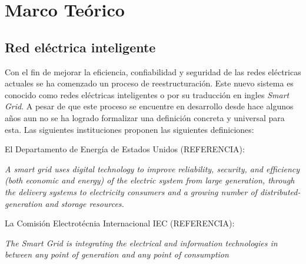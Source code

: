 \chapter{Marco Teórico}\label{sec:Marco_Teorico}
\thispagestyle{empty}
\newcommand{\subsubsubsection}[1]{\paragraph{#1}\mbox{}\\}
\setcounter{secnumdepth}{4}
\setcounter{tocdepth}{4}

\newcommand{\subsubsubsubsection}[1]{\paragraph{#1}\mbox{}\\}
\setcounter{secnumdepth}{5}
\setcounter{tocdepth}{5}

\begingroup
{}
\small

\endgroup

\section{Red eléctrica inteligente}
  \par Con el fin de mejorar la eficiencia, confiabilidad y seguridad de las redes eléctricas actuales se ha comenzado un proceso de reestructuración. Este nuevo sistema es conocido como redes eléctricas inteligentes o por su traducción en ingles \textit{Smart Grid}. A pesar de que este proceso se encuentre en desarrollo desde hace algunos años aun no se ha logrado formalizar una definición concreta y universal para esta. Las siguientes instituciones proponen las siguientes definiciones:

  \par El Departamento de Energía de Estados Unidos (REFERENCIA):
  \par \textit{A smart grid uses digital technology to improve reliability, security, and efficiency (both economic and energy) of the electric system from large generation, through the delivery systems to electricity consumers and a growing number of distributed-generation and storage resources.}

  \par La Comisión Electrotécnia Internacional IEC (REFERENCIA):
  \par \textit{The Smart Grid is integrating the electrical and information technologies in between any point of generation and any point of consumption}

